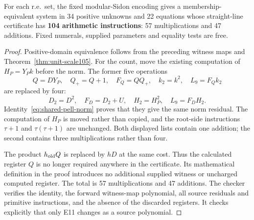 \begin{theorem}\label{thm:best104}
For each r.e.\ set, the fixed modular-Sidon encoding gives a
membership-equivalent system in 34 positive unknowns and 22 equations
whose straight-line certificate has \textbf{104 arithmetic instructions}:
57 multiplications and 47 additions. Fixed numerals, supplied parameters
and equality tests are free.
\end{theorem}
\begin{proof}
Positive-domain equivalence follows from the preceding witness maps
and Theorem~\ref{thm:unit-scale105}. For the count, move the existing
computation of $H_P=Y_Pk$ before the norm. The former five operations
\[
 Q=DY_P,\quad Q_+=Q+1,\quad F_Q=QQ_+,
 \quad k_2=k^2,\quad L_9=F_Qk_2
\]
are replaced by four:
\[
 D_2=D^2,\quad F_D=D_2+U,\quad H_2=H_P^2,
 \quad L_9=F_DH_2.
\]
Identity~\eqref{eq:shared-pell-norm} proves that they give the same
norm residual. The computation of $H_P$ is moved rather than copied,
and the root-side instructions $\tau+1$ and $\tau(\tau+1)$ are
unchanged. Both displayed lists contain one addition; the second
contains three multiplications rather than four.

The product $h_{\rm old}Q$ is replaced by $hD$ at the same cost.
Thus the calculated register $Q$ is no longer required anywhere in
the certificate. Its mathematical definition in the proof introduces
no additional supplied witness or uncharged computed register.
The total is 57 multiplications and 47 additions. The checker
verifies the identity, the forward witness-map polynomial, all source
residuals and primitive instructions, and the absence of the discarded
registers. It checks explicitly that only E11 changes as a source
polynomial.
\end{proof}
